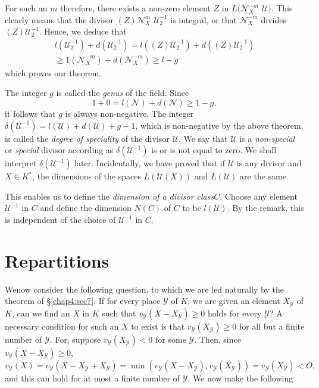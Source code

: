 For such an $m$ therefore, there exists a non-zero element $Z$ in
$L(\mathscr{N}_X^{-m}$ $\mathscr{U})$. This clearly means that the
divisor $(Z) \mathscr{N}_X^m$ $\mathscr{U}_2^{-1}$ is integral, or that
$\mathscr{N}_X^{-m}$ divides $(Z) \mathscr{U}_2^{-1}$. Hence, we
deduce that  
\begin{multline*}
l(\mathscr{U}_2^{-1}) + d(\mathscr{U}_2^{-1}) =
l((Z)\mathscr{U}_2^{-1}) + d((Z)\mathscr{U}_2^{-1})\\ 
\ge 1(\mathscr{N}_X^{-m}) + d(\mathscr{N}_X^{-m}) \ge l -g 
\end{multline*}
which proves our theorem.

The integer $g$ is called the \textit{genus} of the field. Since
$$
1 + 0 = l(\mathscr{N}) + d(\mathscr{N}) \ge 1 - g ,
$$
it follows that $g$ is always non-negative. The integer $\delta
(\mathscr{U}^{-1}) = l(\mathscr{U}) + d(\mathscr{U}) + g-1$, which is
non-negative by the above theorem, is called the \textit {degree of
  speciality} of the divisor $\mathscr{U}$. We say that $\mathscr{U}$
is a \textit{non-special} or \textit {special} divisor according as
$\delta (\mathscr{U}^{-1})$ is or is not equal to zero. We shall
interpret $\delta (\mathscr{U}^{-1})$ later. Incidentally, we have
proved that if $\mathscr{U}$ is any divisor and $X \in K^*$, the
dimensions of the spaces $L(\mathscr{U} (X))$ and $L(\mathscr{U})$ are
the same. 

This  enables us to define the \textit{dimension of a divisor
  class}$C$. Choose any element $\mathscr{U}^{-1}$ in $C$ and define
the dimension $N(C)$ of $C$ to be $l(\mathscr{U})$. By the remark,
this is independent of the choice of $\mathscr{U}^{-1}$ in $C$. 

\section{Repartitions}\label{chap7:sce13}%

We\pageoriginale now consider the following question, to which we are led naturally
by the theorem of \S \ref{chap4:sec7}. If for every place $\mathscr{Y}$ of $K$, we
are given an element $X_\mathscr{Y}$ of $K$, can we find an $X$ in $K$
such that $v_\mathscr{Y}(X - X_\mathscr{Y}) \ge 0$ holds for every
$\mathscr{Y}$? A necessary condition for such an $X$ to exist is
that $v_\mathscr{Y} (X_\mathscr{Y}) \ge 0$ for all but a finite number
of $\mathscr{Y}$. For, suppose $v_\mathscr{Y}(X_\mathscr{Y})< 0$ for
some $\mathscr{Y}$. Then, since $v_\mathscr{Y} (X - X_\mathscr{Y}) \ge
0$, 
{\fontsize{10pt}{12pt}\selectfont
$$
v_\mathscr{Y}(X) = v_\mathscr{Y} (X-X_\mathscr{Y} + X_\mathscr{Y}) =
\min (v_\mathscr{Y}(X-X_\mathscr{Y}), v_\mathscr{Y}(X_\mathscr{Y})) =
v_\mathscr{Y} (X_\mathscr{Y}) < O , 
$$}\relax
and this can hold for at most a finite number of $\mathscr{Y}$. We now
make the following 

